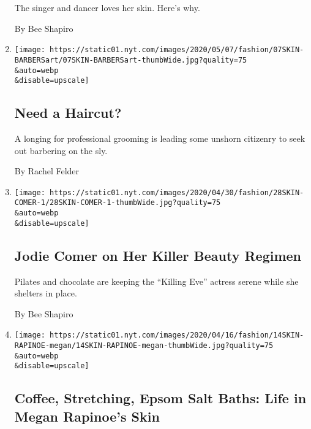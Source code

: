 \begin{enumerate}
  The singer and dancer loves her skin. Here's why.

  By Bee Shapiro
\item
  \href{/2020/05/06/style/coronavirus-haircuts-barbers.html}{}

  \texttt{[image: https://static01.nyt.com/images/2020/05/07/fashion/07SKIN-BARBERSart/07SKIN-BARBERSart-thumbWide.jpg?quality=75\\\&auto=webp\\\&disable=upscale]}

  \hypertarget{need-a-haircut}{%
  \subsection{Need a Haircut?}\label{need-a-haircut}}

  A longing for professional grooming is leading some unshorn citizenry
  to seek out barbering on the sly.

  By Rachel Felder
\item
  \href{/2020/04/28/style/beauty-skin-care-jodie-comer-on-her-killer-beauty-regimen.html}{}

  \texttt{[image: https://static01.nyt.com/images/2020/04/30/fashion/28SKIN-COMER-1/28SKIN-COMER-1-thumbWide.jpg?quality=75\\\&auto=webp\\\&disable=upscale]}

  \hypertarget{jodie-comer-on-her-killer-beauty-regimen}{%
  \subsection{Jodie Comer on Her Killer Beauty
  Regimen}\label{jodie-comer-on-her-killer-beauty-regimen}}

  Pilates and chocolate are keeping the ``Killing Eve'' actress serene
  while she shelters in place.

  By Bee Shapiro
\item
  \href{/2020/04/14/fashion/megan-rapinoe-skin-care.html}{}

  \texttt{[image: https://static01.nyt.com/images/2020/04/16/fashion/14SKIN-RAPINOE-megan/14SKIN-RAPINOE-megan-thumbWide.jpg?quality=75\\\&auto=webp\\\&disable=upscale]}

  \hypertarget{coffee-stretching-epsom-salt-baths-life-in-megan-rapinoes-skin}{%
  \subsection{Coffee, Stretching, Epsom Salt Baths: Life in Megan
  Rapinoe's
  Skin}\label{coffee-stretching-epsom-salt-baths-life-in-megan-rapinoes-skin}}


\end{enumerate}
